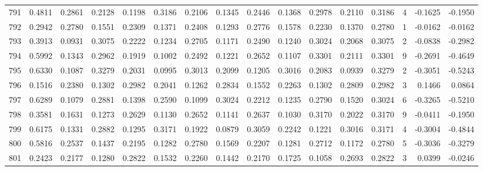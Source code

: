 \begin{tabular}{lrrrrrrrrrrrrrrr}
791 &      0.4811 &  0.2861 &  0.2128 &  0.1198 &  0.3186 &  0.2106 &  0.1345 &  0.2446 &  0.1368 &  0.2978 &   0.2110 &     0.3186 &      4 &                   -0.1625 &                    -0.1950 \\
792 &      0.2942 &  0.2780 &  0.1551 &  0.2309 &  0.1371 &  0.2408 &  0.1293 &  0.2776 &  0.1578 &  0.2230 &   0.1370 &     0.2780 &      1 &                   -0.0162 &                    -0.0162 \\
793 &      0.3913 &  0.0931 &  0.3075 &  0.2222 &  0.1234 &  0.2705 &  0.1171 &  0.2490 &  0.1240 &  0.3024 &   0.2068 &     0.3075 &      2 &                   -0.0838 &                    -0.2982 \\
794 &      0.5992 &  0.1343 &  0.2962 &  0.1919 &  0.1002 &  0.2492 &  0.1221 &  0.2652 &  0.1107 &  0.3301 &   0.2111 &     0.3301 &      9 &                   -0.2691 &                    -0.4649 \\
795 &      0.6330 &  0.1087 &  0.3279 &  0.2031 &  0.0995 &  0.3013 &  0.2099 &  0.1205 &  0.3016 &  0.2083 &   0.0939 &     0.3279 &      2 &                   -0.3051 &                    -0.5243 \\
796 &      0.1516 &  0.2380 &  0.1302 &  0.2982 &  0.2041 &  0.1262 &  0.2834 &  0.1552 &  0.2263 &  0.1302 &   0.2809 &     0.2982 &      3 &                    0.1466 &                     0.0864 \\
797 &      0.6289 &  0.1079 &  0.2881 &  0.1398 &  0.2590 &  0.1099 &  0.3024 &  0.2212 &  0.1235 &  0.2790 &   0.1520 &     0.3024 &      6 &                   -0.3265 &                    -0.5210 \\
798 &      0.3581 &  0.1631 &  0.1273 &  0.2629 &  0.1130 &  0.2652 &  0.1141 &  0.2637 &  0.1030 &  0.3170 &   0.2022 &     0.3170 &      9 &                   -0.0411 &                    -0.1950 \\
799 &      0.6175 &  0.1331 &  0.2882 &  0.1295 &  0.3171 &  0.1922 &  0.0879 &  0.3059 &  0.2242 &  0.1221 &   0.3016 &     0.3171 &      4 &                   -0.3004 &                    -0.4844 \\
800 &      0.5816 &  0.2537 &  0.1437 &  0.2195 &  0.1282 &  0.2780 &  0.1569 &  0.2207 &  0.1281 &  0.2712 &   0.1172 &     0.2780 &      5 &                   -0.3036 &                    -0.3279 \\
801 &      0.2423 &  0.2177 &  0.1280 &  0.2822 &  0.1532 &  0.2260 &  0.1442 &  0.2170 &  0.1725 &  0.1058 &   0.2693 &     0.2822 &      3 &                    0.0399 &                    -0.0246 \\

\end{tabular}
